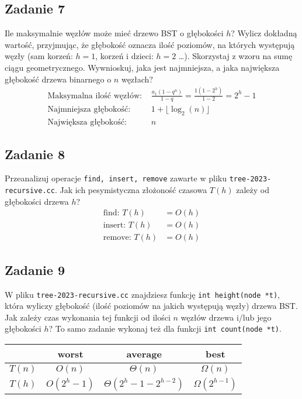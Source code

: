 \documentclass{article}
\begin{document}
\subsection*{Zadanie 7}
Ile maksymalnie węzłów może mieć drzewo BST o głębokości $h$? Wylicz dokładną wartość,
przyjmując, że głębokość oznacza ilość poziomów, na których występują węzły (sam
korzeń: $h = 1$, korzeń i dzieci: $h = 2$ \dots ). Skorzystaj z wzoru na sumę ciągu geometrycznego.
Wywnioskuj, jaka jest najmniejsza, a jaka największa głębokość drzewa binarnego o $n$ węzłach?
\begin{align*}
    \text{Maksymalna ilość węzłów: } & \frac{a_1(1-q^n)}{1-q} = \frac{1(1-2^h)}{1-2} = 2^h-1 \\
    \text{Najmniejsza głębokość: }   & 1 + \lfloor \log_2(n) \rfloor                         \\
    \text{Największa głębokość: }    & n
\end{align*}

\subsection*{Zadanie 8}
Przeanalizuj operacje \verb|find, insert, remove| zawarte w pliku \verb|tree-2023-recursive.cc|.
Jak ich pesymistyczna złożoność czasowa $T(h)$ zależy od głębokości drzewa $h$?
\begin{align*}
    \text{find: } T(h)   & = O(h) \\
    \text{insert: } T(h) & = O(h) \\
    \text{remove: } T(h) & = O(h)
\end{align*}

\subsection*{Zadanie 9}
W pliku \verb|tree-2023-recursive.cc| znajdziesz funkcję \verb|int height(node *t)|, która
wyliczy głębokość (ilość poziomów na jakich występują węzły) drzewa BST. Jak zależy czas
wykonania tej funkcji od ilości $n$ węzłów drzewa i/lub jego głębokości $h$? To samo zadanie
wykonaj też dla funkcji \verb|int count(node *t)|.
\begin{center}
    \begin{tabular}{c|c|c|c}
               & worst      & average         & best              \\
        \hline
        $T(n)$ & $O(n)$     & $\Theta(n)$     & $\Omega(n)$       \\
        $T(h)$ & $O(2^h-1)$ & $\Theta(2^h-1 - 2^{h-2})$ & $\Omega(2^{h-1})$ \\
    \end{tabular}
\end{center}
\end{document}
